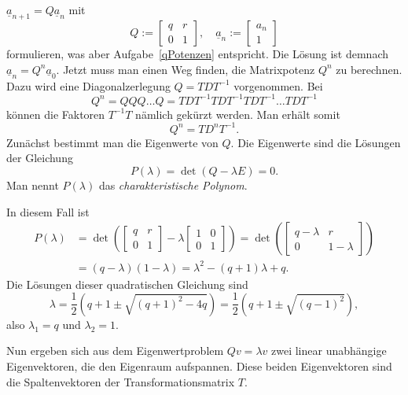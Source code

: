 \documentclass[a4paper,10pt,fleqn,twoside]{scrartcl}
\numberwithin{equation}{section}
\theoremstyle{Aufgabe}
\begin{document}
$\underline a_{n+1} = Q\underline a_n$
mit
\[ Q:=\begin{bmatrix}
q & r\\
0 & 1
\end{bmatrix},\quad
\underline a_n := \begin{bmatrix}a_n\\ 1\end{bmatrix}\]
formulieren, was aber Aufgabe~\ref{qPotenzen} entspricht. Die
Lösung ist demnach
$\underline a_n = Q^n\underline a_0.$
Jetzt muss man einen Weg finden, die Matrixpotenz $Q^n$ zu berechnen.
Dazu wird eine Diagonalzerlegung $Q = TDT^{-1}$ vorgenommen.
Bei
\[Q^n = QQQ\ldots Q = TDT^{-1} TDT^{-1} TDT^{-1} \ldots TDT^{-1}\]
können die Faktoren $T^{-1}T$ nämlich gekürzt werden. Man erhält
somit
\[Q^n = TD^n T^{-1}.\]
Zunächst bestimmt man die Eigenwerte von $Q$. Die Eigenwerte
sind die Lösungen der Gleichung
\[P(\lambda) = \det(Q-\lambda E)=0.\]
Man nennt $P(\lambda)$ das \emph{charakteristische Polynom}.

In diesem Fall ist
\[\begin{split}
P(\lambda) &= \det\left(\begin{bmatrix}
q & r\\
0 & 1
\end{bmatrix}-\lambda\begin{bmatrix}
1 & 0\\
0 & 1
\end{bmatrix}\right)
= \det\left(\begin{bmatrix}
q-\lambda & r\\
0 & 1-\lambda
\end{bmatrix}\right)\\
&= (q-\lambda)(1-\lambda)
= \lambda^2 -(q+1)\lambda+q.\end{split}
\]
Die Lösungen dieser quadratischen Gleichung sind
\[\lambda = \frac{1}{2}(q+1\pm\sqrt{(q+1)^2-4q})
= \frac{1}{2}(q+1\pm\sqrt{(q-1)^2}),\]
also $\lambda_1 = q$ und $\lambda_2=1.$

Nun ergeben sich aus dem Eigenwertproblem $Qv = \lambda v$ zwei linear
unabhängige Eigenvektoren, die den Eigenraum aufspannen. Diese beiden
Eigenvektoren sind die Spaltenvektoren der Transformationsmatrix $T$.
\end{document}
